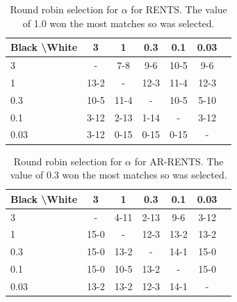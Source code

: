     \begin{table}[tbp]
    \centering
        \begin{tabular}{l|cccccc}
            \textbf{Black \textbackslash White}     & 3  & 1   & 0.3   & 0.1    & 0.03    \\ 
            \hline
                                    3            & -     	&   	7-8	&  9-6 		&  10-5 		&  9-6 		\\
                                    1            &  13-2 		& -     	& 12-3 		& 11-4  		&  12-3 		\\
                                    0.3          &   10-5 	& 11-4   	&   -   &  10-5 		&  5-10 		\\
                                    0.1          &   3-12		&  2-13 		& 1-14  		& -     	&  3-12 		\\
                                    0.03         &   3-12		&  0-15 		&  0-15 		&  0-15 		&   -   	\\    
        \end{tabular}
        \caption[Round robin  selection for $\alpha$ for RENTS.]{Round robin  selection for $\alpha$ for RENTS. The value of 1.0 won the most matches so was selected. \label{tab:w050}}
    \end{table}
    
    \begin{table}[tbp]
    \centering
        \begin{tabular}{l|cccccc}
            \textbf{Black \textbackslash White}     & 3  & 1   & 0.3   & 0.1    & 0.03    \\ 
            \hline
                                    3            & -     	&  4-11 		&  2-13 		& 9-6  		& 3-12  		\\
                                    1            &  15-0 		& -     	&  12-3		& 13-2  		&   13-2		\\
                                    0.3          &  15-0  	&  13-2  	&   -   &  14-1 		&  15-0 		\\
                                    0.1          &  15-0 		&   10-5		&   13-2		& -     	&  15-0 		\\
                                    0.03         &  13-2 		&  13-2 		&  12-3 		&   	14-1	&   -   	\\    
        \end{tabular}
        \caption[Round robin  selection for $\alpha$ for AR-RENTS.]{Round robin  selection for $\alpha$ for AR-RENTS. The value of 0.3 won the most matches so was selected. \label{tab:x050}}
    \end{table}
    
